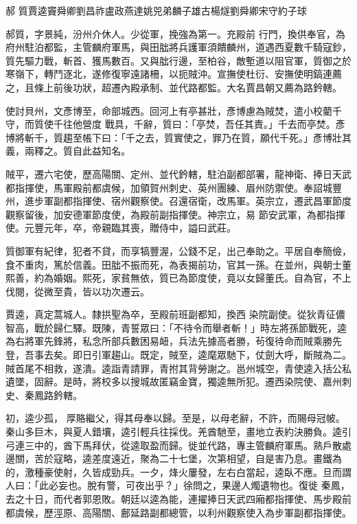 
\begin{pinyinscope}

 郝
 質賈逵竇舜卿劉昌祚盧政燕達姚兕弟麟子雄古楊燧劉舜卿宋守約子球



 郝質，字景純，汾州介休人。少從軍，挽強為第一。充殿前
 行門，換供奉官，為府州駐泊都監，主管麟府軍馬，與田朏將兵護軍須饋麟州，道遇西夏數千騎寇鈔，質先驅力戰，斬首、獲馬數百。又與朏行邊，至柏谷，敵塹道以阻官軍，質御之於寒嶺下，轉鬥逐北，遂修復寧遠諸柵，以扼賊沖。宣撫使杜衍、安撫使明鎬連薦之，且條上前後功狀，超遷內殿承制、並代路都監。大名賈昌朝又薦為路鈐轄。



 使討貝州，文彥博至，命部城西。回河上有亭甚壯，彥博慮為賊焚，遣小校藺千守，而質使千往他營度
 戰具，千辭，質曰：「亭焚，吾任其責。」千去而亭焚。彥博將斬千，質趨至帳下曰：「千之去，質實使之，罪乃在質，願代千死。」彥博壯其義，兩釋之。質自此益知名。



 賊平，遷六宅使，歷高陽關、定州、並代鈐轄，駐泊副都部署，龍神衛、捧日天武都指揮使，馬軍殿前都虞候，加領賀州刺史、英州團練、眉州防禦使。奉詔城豐州，進步軍副都指揮使、宿州觀察使。召還宿衛，改馬軍。英宗立，遷武昌軍節度觀察留後，加安德軍節度使，為殿前副指揮使。神宗立，易
 節安武軍，為都指揮使。元豐元年，卒，帝親臨其喪，贈侍中，謚曰武莊。



 質御軍有紀律，犯者不貸，而享犒豐渥，公錢不足，出己奉助之。平居自奉簡儉，食不重肉，篤於信義。田朏不振而死，為表揭前功，官其一孫。在並州，與朝士董熙善，約為婚姻。熙死，家貧無依，質已為節度使，竟以女歸董氏。自為官，不上伐閱，從微至貴，皆以功次遷云。



 賈逵，真定蒿城人。隸拱聖為卒，至殿前班副都知，換西
 染院副使。從狄青征儂智高，戰於歸仁驛。既陳，青誓眾曰：「不待令而舉者斬！」時左將孫節戰死，逵為右將軍先鋒將，私念所部兵數困易衄，兵法先據高者勝，茍復待命而賊乘勝先登，吾事去矣。即日引軍趨山。既定，賊至，逵麾眾馳下，仗劍大呼，斷賊為二。賊首尾不相救，遂潰。逵詣青請罪，青拊其背勞謝之。邕州城空，青使逵入括公私遺墜，固辭。是時，將校多以搜城故匿竊金寶，獨逵無所犯。遷西染院使、嘉州刺史、秦鳳路鈐轄。



 初，逵少孤，
 厚賂繼父，得其母奉以歸。至是，以母老辭，不許，而賜母冠帔。秦山多巨木，與夏人錯壤，逵引輕兵往採伐。羌酋馳至，畫地立表約決勝負。逵引弓連三中的，酋下馬拜伏，從逵取盈而歸。徙並代路，專主管麟府軍馬。熟戶散處邊關，苦於寇略，逵差度遠近，聚為二十七堡，次第相望，自是害乃息。畫鐵為的，激種豪使射，久皆成勁兵。一夕，烽火屢發，左右白當起，逵臥不應。旦而謂人曰：「此必妄也。脫有警，可夜出乎？」徐問之，果邊人燭遺物也。復徙
 秦鳳，去之十日，而代者郭恩敗。朝廷以逵為能，連擢捧日天武四廂都指揮使、馬步殿前都虞候，歷涇原、高陽關、鄜延路副都總管，以利州觀察使入為步軍副都指揮使。




\end{pinyinscope}
